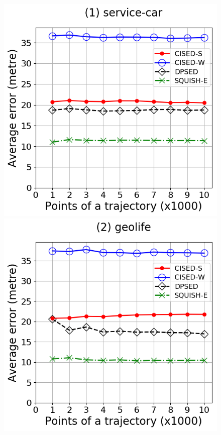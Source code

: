 {\begin{figure}[tb!]
	\centering
	\includegraphics[scale = 0.2750]{Figures/Exp-error-size-service.png}\hspace{3ex}
	\includegraphics[scale = 0.2750]{Figures/Exp-error-size-geolife.png}\hspace{3ex}

\end{figure}}
